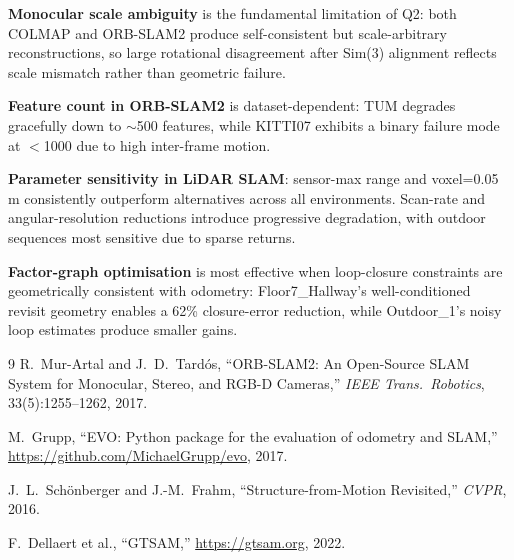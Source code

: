 \documentclass[10pt,twocolumn]{article}
\begin{document}
\textbf{Monocular scale ambiguity} is the fundamental limitation of Q2: both
COLMAP and ORB-SLAM2 produce self-consistent but scale-arbitrary
reconstructions, so large rotational disagreement after Sim(3) alignment
reflects scale mismatch rather than geometric failure.

\textbf{Feature count in ORB-SLAM2} is dataset-dependent: TUM degrades
gracefully down to $\sim$500 features, while KITTI07 exhibits a binary
failure mode at $<$1000 due to high inter-frame motion.

\textbf{Parameter sensitivity in LiDAR SLAM}: sensor-max range and
voxel=0.05\,m consistently outperform alternatives across all environments.
Scan-rate and angular-resolution reductions introduce progressive
degradation, with outdoor sequences most sensitive due to sparse returns.

\textbf{Factor-graph optimisation} is most effective when loop-closure
constraints are geometrically consistent with odometry: Floor7\_Hallway's
well-conditioned revisit geometry enables a 62\% closure-error reduction,
while Outdoor\_1's noisy loop estimates produce smaller gains.

\begin{thebibliography}{9}
R.\ Mur-Artal and J.\ D.\ Tard\'{o}s, ``ORB-SLAM2: An Open-Source SLAM
System for Monocular, Stereo, and RGB-D Cameras,''
\textit{IEEE Trans.\ Robotics}, 33(5):1255--1262, 2017.

M.\ Grupp, ``EVO: Python package for the evaluation of odometry and SLAM,''
\url{https://github.com/MichaelGrupp/evo}, 2017.

J.\ L.\ Sch\"{o}nberger and J.-M.\ Frahm, ``Structure-from-Motion
Revisited,'' \textit{CVPR}, 2016.

F.\ Dellaert et al., ``GTSAM,''
\url{https://gtsam.org}, 2022.
\end{thebibliography}
\end{document}
